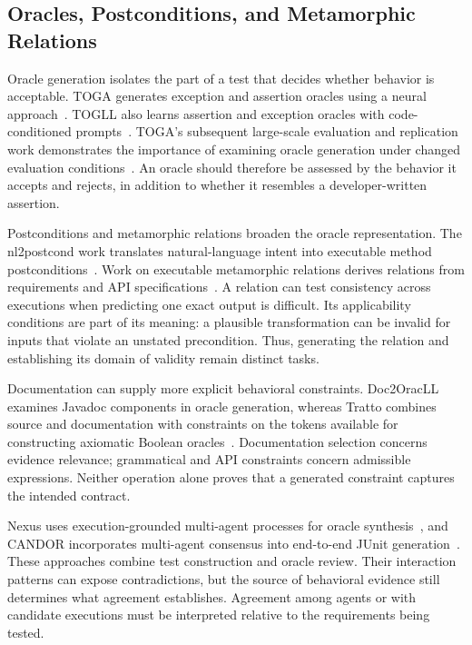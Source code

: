 \subsection{Oracles, Postconditions, and Metamorphic Relations}
Oracle generation isolates the part of a test that decides whether behavior is acceptable. TOGA generates exception and assertion oracles using a neural approach~\cite{O04}. TOGLL also learns assertion and exception oracles with code-conditioned prompts~\cite{O07}. TOGA's subsequent large-scale evaluation and replication work demonstrates the importance of examining oracle generation under changed evaluation conditions~\cite{O05}. An oracle should therefore be assessed by the behavior it accepts and rejects, in addition to whether it resembles a developer-written assertion.

Postconditions and metamorphic relations broaden the oracle representation. The nl2postcond work translates natural-language intent into executable method postconditions~\cite{O01}. Work on executable metamorphic relations derives relations from requirements and API specifications~\cite{O02}. A relation can test consistency across executions when predicting one exact output is difficult. Its applicability conditions are part of its meaning: a plausible transformation can be invalid for inputs that violate an unstated precondition. Thus, generating the relation and establishing its domain of validity remain distinct tasks.

Documentation can supply more explicit behavioral constraints. Doc2OracLL examines Javadoc components in oracle generation, whereas Tratto combines source and documentation with constraints on the tokens available for constructing axiomatic Boolean oracles~\cite{O08,O09}. Documentation selection concerns evidence relevance; grammatical and API constraints concern admissible expressions. Neither operation alone proves that a generated constraint captures the intended contract.

Nexus uses execution-grounded multi-agent processes for oracle synthesis~\cite{O03}, and CANDOR incorporates multi-agent consensus into end-to-end JUnit generation~\cite{O06}. These approaches combine test construction and oracle review. Their interaction patterns can expose contradictions, but the source of behavioral evidence still determines what agreement establishes. Agreement among agents or with candidate executions must be interpreted relative to the requirements being tested.

